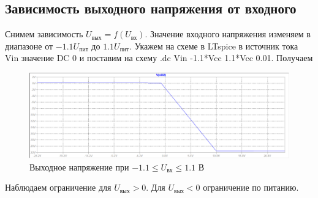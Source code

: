 \documentclass[a4paper, 12pt]{article}
\begin{document}
    \subsection{Зависимость выходного напряжения от входного}
    Снимем зависимость $U_\text{вых}=f\left( U_\text{вх} \right)$.
    Значение входного напряжения изменяем в диапазоне от $-1.1U_\text{пит}$ до $1.1U_\text{пит}$.
    Укажем на схеме в LTspice в источник тока Vin значение DC 0 и поставим на схему
    .dc Vin {-1.1*Vcc} {1.1*Vcc} 0.01. Получаем
    \begin{figure}[H]
        \centering
        \includegraphics[scale=0.46]{1task_fuin.png}
        \captionsetup{skip=0pt}
        \caption{Выходное напряжение при $-1.1\leq U_\text{вх}\leq 1.1$ В}
        \label{fig:1task_fuin}
    \end{figure}
    Наблюдаем ограничение для $U_\text{вых}>0$. Для $U_\text{вых}<0$ ограничение по питанию.
\end{document}
